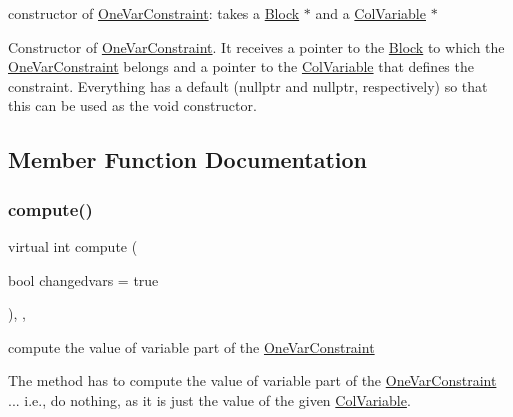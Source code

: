 constructor of \mbox{\hyperlink{class_s_m_spp__di__unipi__it_1_1_one_var_constraint}{One\+Var\+Constraint}}\+: takes a \mbox{\hyperlink{class_s_m_spp__di__unipi__it_1_1_block}{Block}} $\ast$ and a \mbox{\hyperlink{class_s_m_spp__di__unipi__it_1_1_col_variable}{Col\+Variable}} $\ast$ 

Constructor of \mbox{\hyperlink{class_s_m_spp__di__unipi__it_1_1_one_var_constraint}{One\+Var\+Constraint}}. It receives a pointer to the \mbox{\hyperlink{class_s_m_spp__di__unipi__it_1_1_block}{Block}} to which the \mbox{\hyperlink{class_s_m_spp__di__unipi__it_1_1_one_var_constraint}{One\+Var\+Constraint}} belongs and a pointer to the \mbox{\hyperlink{class_s_m_spp__di__unipi__it_1_1_col_variable}{Col\+Variable}} that defines the constraint. Everything has a default (nullptr and nullptr, respectively) so that this can be used as the void constructor. 

\subsection{Member Function Documentation}
\mbox{\label{class_s_m_spp__di__unipi__it_1_1_one_var_constraint_afc8ff54ab05d22f4cca0fb0bfbeb7a49}} 
\subsubsection{\texorpdfstring{compute()}{compute()}}
{\footnotesize\ttfamily virtual int compute (\begin{DoxyParamCaption}\item[{bool}]{changedvars = {\ttfamily true} }\end{DoxyParamCaption})\hspace{0.3cm}{\ttfamily [inline]}, {\ttfamily [override]}, {\ttfamily [virtual]}}



compute the value of variable part of the \mbox{\hyperlink{class_s_m_spp__di__unipi__it_1_1_one_var_constraint}{One\+Var\+Constraint}} 

The method has to compute the value of variable part of the \mbox{\hyperlink{class_s_m_spp__di__unipi__it_1_1_one_var_constraint}{One\+Var\+Constraint}} ... i.\+e., do nothing, as it is just the value of the given \mbox{\hyperlink{class_s_m_spp__di__unipi__it_1_1_col_variable}{Col\+Variable}}. 

